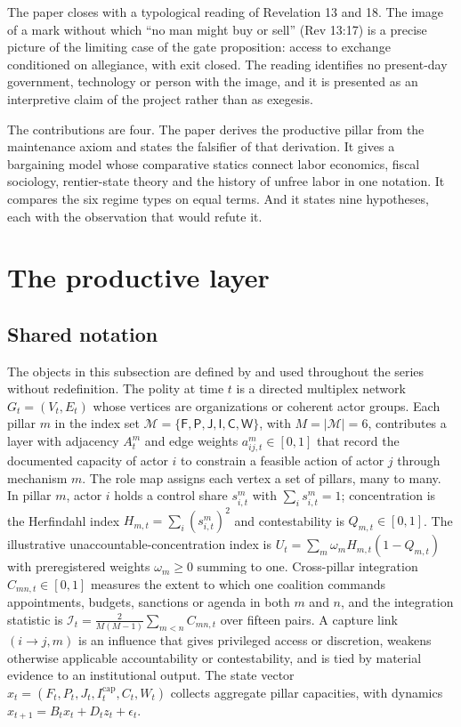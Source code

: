 \documentclass[11pt,letterpaper]{article}
\theoremstyle{definition}
\theoremstyle{remark}
\newcommand{\pF}{\mathsf{F}}
\newcommand{\pP}{\mathsf{P}}
\newcommand{\pJ}{\mathsf{J}}
\newcommand{\pI}{\mathsf{I}}
\newcommand{\pC}{\mathsf{C}}
\newcommand{\pW}{\mathsf{W}}
\newcommand{\Pill}{\mathcal{M}}
\newcommand{\Integ}{\mathcal{I}}
\begin{document}
The paper closes with a typological reading of Revelation 13 and 18. The image of a mark without which ``no man might buy or sell'' (Rev 13:17) is a precise picture of the limiting case of the gate proposition: access to exchange conditioned on allegiance, with exit closed. The reading identifies no present-day government, technology or person with the image, and it is presented as an interpretive claim of the project rather than as exegesis.

The contributions are four. The paper derives the productive pillar from the maintenance axiom and states the falsifier of that derivation. It gives a bargaining model whose comparative statics connect labor economics, fiscal sociology, rentier-state theory and the history of unfree labor in one notation. It compares the six regime types on equal terms. And it states nine hypotheses, each with the observation that would refute it.

\section{The productive layer}
\label{sec:layer}

\subsection{Shared notation}

The objects in this subsection are defined by \citet{largo2026hbs} and used throughout the series without redefinition. The polity at time $t$ is a directed multiplex network $G_t=(V_t,E_t)$ whose vertices are organizations or coherent actor groups. Each pillar $m$ in the index set $\Pill=\{\pF,\pP,\pJ,\pI,\pC,\pW\}$, with $M=|\Pill|=6$, contributes a layer with adjacency $A^m_t$ and edge weights $a^m_{ij,t}\in[0,1]$ that record the documented capacity of actor $i$ to constrain a feasible action of actor $j$ through mechanism $m$. The role map assigns each vertex a set of pillars, many to many. In pillar $m$, actor $i$ holds a control share $s^m_{i,t}$ with $\sum_i s^m_{i,t}=1$; concentration is the Herfindahl index $H_{m,t}=\sum_i (s^m_{i,t})^2$ and contestability is $Q_{m,t}\in[0,1]$. The illustrative unaccountable-concentration index is $U_t=\sum_m \omega_m H_{m,t}(1-Q_{m,t})$ with preregistered weights $\omega_m\ge 0$ summing to one. Cross-pillar integration $C_{mn,t}\in[0,1]$ measures the extent to which one coalition commands appointments, budgets, sanctions or agenda in both $m$ and $n$, and the integration statistic is $\Integ_t=\frac{2}{M(M-1)}\sum_{m<n}C_{mn,t}$ over fifteen pairs. A capture link $(i\to j,m)$ is an influence that gives privileged access or discretion, weakens otherwise applicable accountability or contestability, and is tied by material evidence to an institutional output. The state vector $x_t=(F_t,P_t,J_t,I^{\mathrm{cap}}_t,C_t,W_t)$ collects aggregate pillar capacities, with dynamics $x_{t+1}=B_tx_t+D_tz_t+\epsilon_t$.
\end{document}
